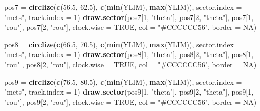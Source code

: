 \documentclass[
]{article}
\newenvironment{Shaded}{\begin{snugshade}}{\end{snugshade}}
\newcommand{\DataTypeTok}[1]{\textcolor[rgb]{0.13,0.29,0.53}{#1}}
\newcommand{\DecValTok}[1]{\textcolor[rgb]{0.00,0.00,0.81}{#1}}
\newcommand{\FloatTok}[1]{\textcolor[rgb]{0.00,0.00,0.81}{#1}}
\newcommand{\KeywordTok}[1]{\textcolor[rgb]{0.13,0.29,0.53}{\textbf{#1}}}
\newcommand{\NormalTok}[1]{#1}
\newcommand{\OtherTok}[1]{\textcolor[rgb]{0.56,0.35,0.01}{#1}}
\newcommand{\StringTok}[1]{\textcolor[rgb]{0.31,0.60,0.02}{#1}}
\begin{document}
\begin{Shaded}
\begin{Highlighting}[]
\NormalTok{pos7 =}\StringTok{ }\KeywordTok{circlize}\NormalTok{(}\KeywordTok{c}\NormalTok{(}\FloatTok{56.5}\NormalTok{, }\FloatTok{62.5}\NormalTok{), }\KeywordTok{c}\NormalTok{(}\KeywordTok{min}\NormalTok{(YLIM), }\KeywordTok{max}\NormalTok{(YLIM)), }\DataTypeTok{sector.index =} \StringTok{"mets"}\NormalTok{, }\DataTypeTok{track.index =} \DecValTok{1}\NormalTok{)}
\KeywordTok{draw.sector}\NormalTok{(pos7[}\DecValTok{1}\NormalTok{, }\StringTok{"theta"}\NormalTok{], pos7[}\DecValTok{2}\NormalTok{, }\StringTok{"theta"}\NormalTok{], pos7[}\DecValTok{1}\NormalTok{, }\StringTok{"rou"}\NormalTok{], pos7[}\DecValTok{2}\NormalTok{, }\StringTok{"rou"}\NormalTok{], }\DataTypeTok{clock.wise =} \OtherTok{TRUE}\NormalTok{, }\DataTypeTok{col =} \StringTok{"#CCCCCC56"}\NormalTok{, }\DataTypeTok{border =} \OtherTok{NA}\NormalTok{) }

\NormalTok{pos8 =}\StringTok{ }\KeywordTok{circlize}\NormalTok{(}\KeywordTok{c}\NormalTok{(}\FloatTok{66.5}\NormalTok{, }\FloatTok{70.5}\NormalTok{), }\KeywordTok{c}\NormalTok{(}\KeywordTok{min}\NormalTok{(YLIM), }\KeywordTok{max}\NormalTok{(YLIM)), }\DataTypeTok{sector.index =} \StringTok{"mets"}\NormalTok{, }\DataTypeTok{track.index =} \DecValTok{1}\NormalTok{)}
\KeywordTok{draw.sector}\NormalTok{(pos8[}\DecValTok{1}\NormalTok{, }\StringTok{"theta"}\NormalTok{], pos8[}\DecValTok{2}\NormalTok{, }\StringTok{"theta"}\NormalTok{], pos8[}\DecValTok{1}\NormalTok{, }\StringTok{"rou"}\NormalTok{], pos8[}\DecValTok{2}\NormalTok{, }\StringTok{"rou"}\NormalTok{], }\DataTypeTok{clock.wise =} \OtherTok{TRUE}\NormalTok{, }\DataTypeTok{col =} \StringTok{"#CCCCCC56"}\NormalTok{, }\DataTypeTok{border =} \OtherTok{NA}\NormalTok{) }

\NormalTok{pos9 =}\StringTok{ }\KeywordTok{circlize}\NormalTok{(}\KeywordTok{c}\NormalTok{(}\FloatTok{76.5}\NormalTok{, }\FloatTok{80.5}\NormalTok{), }\KeywordTok{c}\NormalTok{(}\KeywordTok{min}\NormalTok{(YLIM), }\KeywordTok{max}\NormalTok{(YLIM)), }\DataTypeTok{sector.index =} \StringTok{"mets"}\NormalTok{, }\DataTypeTok{track.index =} \DecValTok{1}\NormalTok{)}
\KeywordTok{draw.sector}\NormalTok{(pos9[}\DecValTok{1}\NormalTok{, }\StringTok{"theta"}\NormalTok{], pos9[}\DecValTok{2}\NormalTok{, }\StringTok{"theta"}\NormalTok{], pos9[}\DecValTok{1}\NormalTok{, }\StringTok{"rou"}\NormalTok{], pos9[}\DecValTok{2}\NormalTok{, }\StringTok{"rou"}\NormalTok{], }\DataTypeTok{clock.wise =} \OtherTok{TRUE}\NormalTok{, }\DataTypeTok{col =} \StringTok{"#CCCCCC56"}\NormalTok{, }\DataTypeTok{border =} \OtherTok{NA}\NormalTok{) }


\end{Highlighting}
\end{Shaded}
\end{document}
